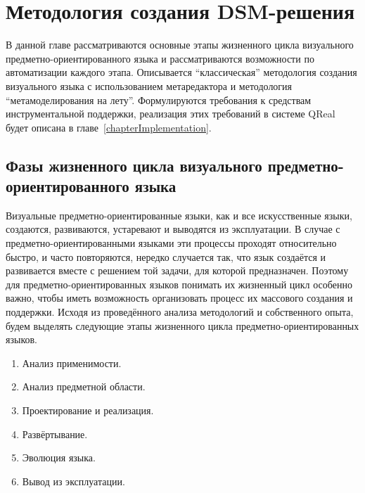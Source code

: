 \chapter{Методология создания DSM-решения}
В данной главе рассматриваются основные этапы жизненного цикла визуального предметно-ориентированного 
языка и рассматриваются возможности по автоматизации каждого этапа. Описывается "`классическая"' 
методология создания визуального языка с использованием метаредактора и методология 
"`метамоделирования на лету"'. Формулируются требования к средствам инструментальной 
поддержки, реализация этих требований в системе QReal будет описана в главе~\ref{chapterImplementation}.

\section{Фазы жизненного цикла визуального предметно-ориентированного языка}
Визуальные предметно-ориентированные языки, как и все искусственные языки, создаются, 
развиваются, устаревают и выводятся из эксплуатации. В случае с предметно-ориентированными 
языками эти процессы проходят относительно быстро, и часто повторяются, нередко случается 
так, что язык создаётся и развивается вместе с решением той задачи, для которой предназначен. 
Поэтому для предметно-ориентированных языков понимать их жизненный цикл особенно важно, 
чтобы иметь возможность организовать процесс их массового создания и поддержки. Исходя 
из проведённого анализа методологий и собственного опыта, будем выделять следующие 
этапы жизненного цикла предметно-ориентированных языков.

\begin{enumerate}
	\item Анализ применимости. 
	\item Анализ предметной области.
	\item Проектирование и реализация.
	\item Развёртывание.
	\item Эволюция языка.
	\item Вывод из эксплуатации.
\end{enumerate}

